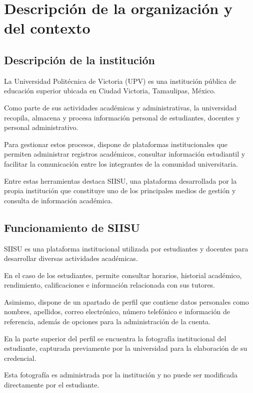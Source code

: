 \documentclass[12pt]{article}
\begin{document}
\section{Descripción de la organización y del contexto}
\subsection{Descripción de la institución}

La Universidad Politécnica de Victoria (UPV) es una
institución pública de educación superior ubicada
en Ciudad Victoria, Tamaulipas, México.

Como parte de sus actividades académicas y
administrativas, la universidad recopila,
almacena y procesa información personal de
estudiantes, docentes y personal administrativo.

Para gestionar estos procesos, dispone de
plataformas institucionales que permiten
administrar registros académicos, consultar
información estudiantil y facilitar la
comunicación entre los integrantes de la
comunidad universitaria.

Entre estas herramientas destaca SIISU,
una plataforma desarrollada por la propia
institución que constituye uno de los
principales medios de gestión y consulta
de información académica.

\subsection{Funcionamiento de SIISU}

SIISU es una plataforma institucional utilizada
por estudiantes y docentes para desarrollar
diversas actividades académicas.

En el caso de los estudiantes, permite consultar
horarios, historial académico, rendimiento,
calificaciones e información relacionada con
sus tutores.

Asimismo, dispone de un apartado de perfil
que contiene datos personales como nombres,
apellidos, correo electrónico, número telefónico
e información de referencia, además de
opciones para la administración de la cuenta.

En la parte superior del perfil se encuentra
la fotografía institucional del estudiante,
capturada previamente por la universidad
para la elaboración de su credencial.

Esta fotografía es administrada por la
institución y no puede ser modificada
directamente por el estudiante.
\end{document}

